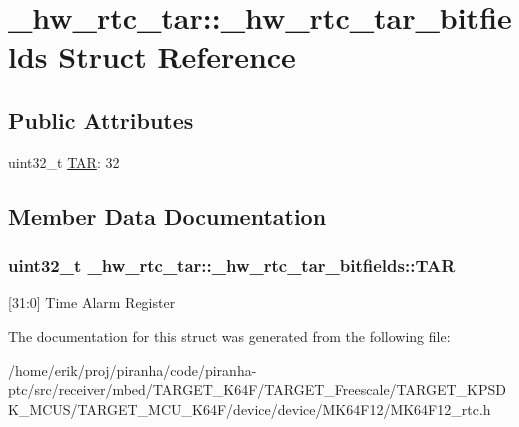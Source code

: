 \hypertarget{struct__hw__rtc__tar_1_1__hw__rtc__tar__bitfields}{}\section{\+\_\+hw\+\_\+rtc\+\_\+tar\+:\+:\+\_\+hw\+\_\+rtc\+\_\+tar\+\_\+bitfields Struct Reference}
\label{struct__hw__rtc__tar_1_1__hw__rtc__tar__bitfields}
\subsection*{Public Attributes}
\begin{DoxyCompactItemize}
\item 
uint32\+\_\+t \hyperlink{struct__hw__rtc__tar_1_1__hw__rtc__tar__bitfields_a96abf0ff67e9f971247651c4b89572bd}{T\+AR}\+: 32
\end{DoxyCompactItemize}


\subsection{Member Data Documentation}
\subsubsection[{\texorpdfstring{T\+AR}{TAR}}]{\setlength{\rightskip}{0pt plus 5cm}uint32\+\_\+t \+\_\+hw\+\_\+rtc\+\_\+tar\+::\+\_\+hw\+\_\+rtc\+\_\+tar\+\_\+bitfields\+::\+T\+AR}\hypertarget{struct__hw__rtc__tar_1_1__hw__rtc__tar__bitfields_a96abf0ff67e9f971247651c4b89572bd}{}\label{struct__hw__rtc__tar_1_1__hw__rtc__tar__bitfields_a96abf0ff67e9f971247651c4b89572bd}
\mbox{[}31\+:0\mbox{]} Time Alarm Register 

The documentation for this struct was generated from the following file\+:\begin{DoxyCompactItemize}
\item 
/home/erik/proj/piranha/code/piranha-\/ptc/src/receiver/mbed/\+T\+A\+R\+G\+E\+T\+\_\+\+K64\+F/\+T\+A\+R\+G\+E\+T\+\_\+\+Freescale/\+T\+A\+R\+G\+E\+T\+\_\+\+K\+P\+S\+D\+K\+\_\+\+M\+C\+U\+S/\+T\+A\+R\+G\+E\+T\+\_\+\+M\+C\+U\+\_\+\+K64\+F/device/device/\+M\+K64\+F12/M\+K64\+F12\+\_\+rtc.\+h\end{DoxyCompactItemize}

